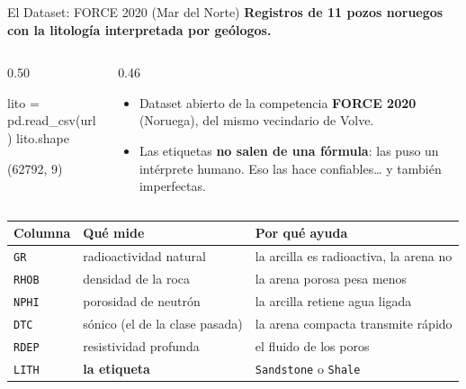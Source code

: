\documentclass[aspectratio=169, 11pt]{beamer}
\begin{document}
\begin{frame}[fragile,shrink=32]{El Dataset: FORCE 2020 (Mar del Norte)}
  \vspace{-4pt}
  {\small\color{arcaDark}\bfseries
    Registros de \textbf{11 pozos} noruegos con la litología \textbf{interpretada por geólogos}.}

  \vspace{4pt}
  \begin{columns}[T]
    \begin{column}{0.50\textwidth}
      \begin{pyblock}
lito = pd.read_csv(url)
lito.shape
      \end{pyblock}
      \vspace{2pt}
      \begin{outputblock}[]
(62792, 9)
      \end{outputblock}
    \end{column}
    \begin{column}{0.46\textwidth}
      {\scriptsize\color{textMuted}
      \begin{itemize}\setlength{\itemsep}{4pt}
        \item[{\color{arcaRed}\scriptsize\faDatabase}]
          Dataset abierto de la competencia \textbf{FORCE 2020}
          (Noruega), del mismo vecindario de Volve.
        \item[{\color{codeGreen}\scriptsize\faCheck}]
          Las etiquetas \textbf{no salen de una fórmula}: las puso
          un intérprete humano. Eso las hace confiables\ldots
          y también imperfectas.
      \end{itemize}
      }
    \end{column}
  \end{columns}

  \vspace{4pt}
  \centering
  {\scriptsize
  \renewcommand{\arraystretch}{1.25}
  \begin{tabular}{@{}l l l@{}}
    \toprule
    {\bfseries\color{arcaRed} Columna} & {\bfseries\color{arcaDark} Qué mide} & {\bfseries\color{arcaDark} Por qué ayuda} \\
    \midrule
    \texttt{GR} & radioactividad natural & la arcilla es radioactiva, la arena no \\
    \texttt{RHOB} & densidad de la roca & la arena porosa pesa menos \\
    \texttt{NPHI} & porosidad de neutrón & la arcilla retiene agua ligada \\
    \texttt{DTC} & sónico (el de la clase pasada) & la arena compacta transmite rápido \\
    \texttt{RDEP} & resistividad profunda & el fluido de los poros \\
    \midrule
    \texttt{LITH} & \textbf{la etiqueta} & \texttt{Sandstone} o \texttt{Shale} \\
    \bottomrule
  \end{tabular}
  }
\end{frame}
\end{document}
